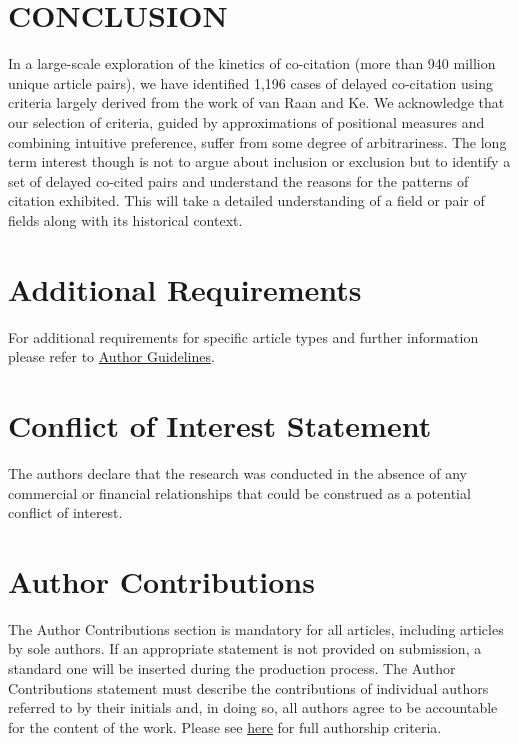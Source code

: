 \documentclass[utf8]{frontiersSCNS}
\begin{document}
\section{CONCLUSION} In a large-scale exploration of the kinetics of co-citation (more than 940 million unique article pairs), we have identified 1,196 cases of delayed co-citation using criteria largely derived from the work of van Raan and Ke. We acknowledge that our selection of criteria, guided by approximations of positional measures and combining intuitive preference, suffer from some degree of arbitrariness. The long term interest though is not to argue about inclusion or exclusion but to identify a set of delayed co-cited pairs and understand the reasons for the patterns of citation exhibited. This will take a detailed understanding of a field or pair of fields along with its historical context. 

\section{Additional Requirements}

For additional requirements for specific article types and further information please refer to \href{http://www.frontiersin.org/about/AuthorGuidelines#AdditionalRequirements}{Author Guidelines}.

\section*{Conflict of Interest Statement}

The authors declare that the research was conducted in the absence of any commercial or financial relationships that could be construed as a potential conflict of interest.

\section*{Author Contributions}

The Author Contributions section is mandatory for all articles, including articles by sole authors. If an appropriate statement is not provided on submission, a standard one will be inserted during the production process. The Author Contributions statement must describe the contributions of individual authors referred to by their initials and, in doing so, all authors agree to be accountable for the content of the work. Please see  \href{http://home.frontiersin.org/about/author-guidelines#AuthorandContributors}{here} for full authorship criteria.
\end{document}
